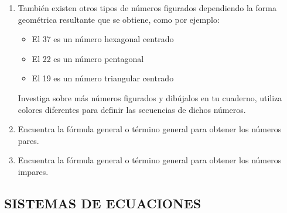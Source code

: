 \documentclass[12pt,a4paper]{article}
\begin{document}
\begin{enumerate}[label=\alph*.]
    \item También existen otros tipos de números figurados dependiendo la forma geométrica resultante que se obtiene, como por ejemplo:

    \begin{itemize}
        \item El 37 es un número hexagonal centrado
        \item El 22 es un número pentagonal
        \item El 19 es un número triangular centrado
    \end{itemize}

    Investiga sobre más números figurados y dibújalos en tu cuaderno, utiliza colores diferentes para definir las secuencias de dichos números.

    \item Encuentra la fórmula general o término general para obtener los números pares.

    \item Encuentra la fórmula general o término general para obtener los números impares.
\end{enumerate}

\vspace{1cm}

\subsection*{SISTEMAS DE ECUACIONES}
\end{document}
